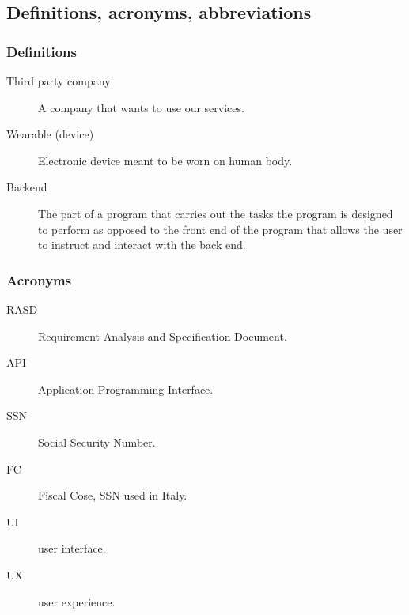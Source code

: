 \documentclass[../main.tex]{subfiles}
\begin{document}
%
%
%
%
%

\subsection{Definitions, acronyms, abbreviations}

\subsubsection{Definitions}
\begin{description}

	\item [Third party company] A company that wants to use our services.
	\item [Wearable (device)] Electronic device meant to be worn on human body.
	\item [Backend] The part of a program that carries out the tasks the program is designed to perform as opposed to the front end of the program that allows the user to instruct and interact with the back end.

\end{description}


\subsubsection{Acronyms}
\begin{description}

	\item [RASD] Requirement Analysis and Specification Document.
	\item [API] Application Programming Interface.
	\item [SSN] Social Security Number.
	\item [FC] Fiscal Cose, SSN used in Italy.
	\item [UI] user interface.
	\item [UX] user experience.

\end{description}
\end{document}
